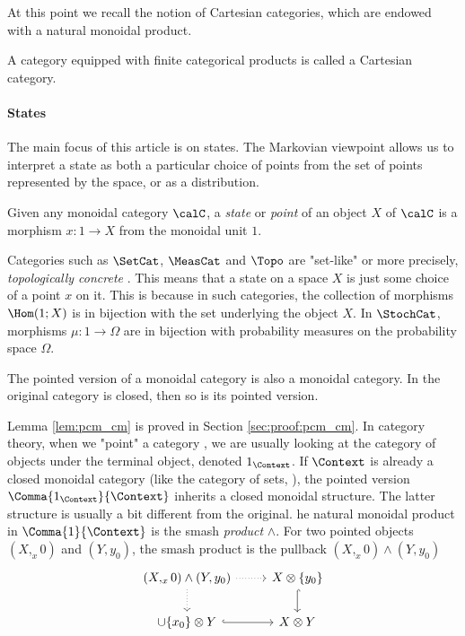 \documentclass[12pt,oneside,pb-diagram]{article}
\begin{document}
At this point we recall the notion of Cartesian categories, which are endowed with a natural monoidal product.

\begin{definition} 
	A category equipped with finite categorical products is called a Cartesian category.
\end{definition}

\paragraph{States} The main focus of this article is on states. The Markovian viewpoint allows us to interpret a state as both a particular choice of points from the set of points represented by the space, or as a distribution.

\begin{definition} 
	Given any monoidal category $\calC$, a \textit{state} or \textit{point} of an object $X$ of $\calC$ is a morphism $x : 1\to X$ from the monoidal unit $1$.
\end{definition}

\begin{Erg}{}{} 
	Categories such as $\SetCat$, $\MeasCat$ and $\Topo$ are "set-like" or more precisely, \textit{topologically concrete} \cite[see]{DasSuda2024recon}. This means that a state on a space $X$ is just some choice of a point $x$ on it. This is because in such categories, the collection of morphisms $\Hom(1;X)$ is in bijection with the set underlying the object $X$. In $\StochCat$, morphisms $\mu :1 \to \Omega$ are in bijection with probability measures on the probability space $\Omega$.
\end{Erg}

\begin{lemma} \label{lem:pcm_cm}
	The pointed version of a monoidal category is also a monoidal category. In the original category is closed, then so is its pointed version.
\end{lemma}

Lemma \ref{lem:pcm_cm} is proved in Section \ref{sec:proof:pcm_cm}.
In category theory, when we "point" a category , we are usually looking at the category of objects under the terminal object, denoted $1_{\Context}$. If $\Context$ is already a closed monoidal category (like the category of sets, ), the pointed version $\Comma{1_{\Context}}{\Context}$ inherits a closed monoidal structure. The latter structure is usually a bit different from the original. he natural monoidal product in $\Comma{1}{\Context}$ is the smash \textit{product} $\wedge$. For two pointed objects $(X,_x0)$ and $(Y, y_0)$, the smash product is the pullback $(X,_x0) \wedge (Y, y_0)$
%
\begin{equation}
	\begin{tikzcd}
		(X,_x0) \wedge (Y, y_0) \arrow[r, dotted] \arrow[d, dotted] & X \otimes \{y_0\} \arrow[d, hook] \\
		\cup \{x_0\} \otimes Y \arrow[r, hook] & X \otimes Y
	\end{tikzcd}
\end{equation}
%
\end{document}
